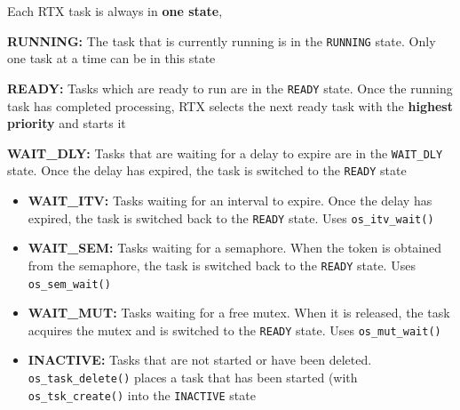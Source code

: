\documentclass[a4paper,11pt]{article}
\newcommand{\code}[1]{\texttt{#1}}
\begin{document}
\Needspace{260pt}



Each RTX task is always in \textbf{one state},\par



\textbf{RUNNING:} The task that is currently running is in the \code{RUNNING} state. Only one task at a time can be in this state\par



\textbf{READY:} Tasks which are ready to run are in the \code{READY} state. Once the running task has completed processing, RTX selects the next ready task with the \textbf{highest priority} and starts it\par



\textbf{WAIT\_DLY:} Tasks that are waiting for a delay to expire are in the \code{WAIT\_DLY} state. Once the delay has expired, the task is switched to the \code{READY} state\par

\Needspace{112pt}
\begin{itemize}
\item \textbf{WAIT\_ITV:} Tasks waiting for an interval to expire. Once the delay has expired, the task is switched back to the \code{READY} state. Uses \code{os\_itv\_wait()}
\item \textbf{WAIT\_SEM:} Tasks waiting for a semaphore. When the token is obtained from the semaphore, the task is switched back to the \code{READY} state. Uses \code{os\_sem\_wait()}
\item \textbf{WAIT\_MUT:} Tasks waiting for a free mutex. When it is released, the task acquires the mutex and is switched to the \code{READY} state. Uses \code{os\_mut\_wait()}
\item \textbf{INACTIVE:} Tasks that are not started or have been deleted. \code{os\_task\_delete()} places a task that has been started (with \code{os\_tsk\_create()} into the \code{INACTIVE} state
\end{itemize}
\end{document}
